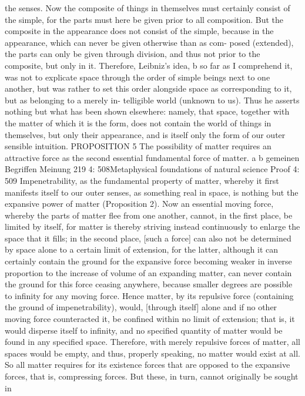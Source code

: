the senses. Now the composite of things in themselves must certainly consist
of the simple, for the parts must here be given prior to all composition.
But the composite in the appearance does not consist of the simple, because
in the appearance, which can never be given otherwise than as com-
posed (extended), the parts can only be given through division, and thus
not prior to the composite, but only in it. Therefore, Leibniz’s idea, b
so far as I comprehend it, was not to explicate space through the order
of simple beings next to one another, but was rather to set this order
alongside space as corresponding to it, but as belonging to a merely in-
telligible world (unknown to us). Thus he asserts nothing but what has
been shown elsewhere: namely, that space, together with the matter of
which it is the form, does not contain the world of things in themselves,
but only their appearance, and is itself only the form of our outer sensible
intuition.
PROPOSITION 5
The possibility of matter requires an attractive force as the second essential
fundamental force of matter.
a
b
gemeinen Begriffen
Meinung
219
4: 508Metaphysical foundations of natural science
Proof
4: 509
Impenetrability, as the fundamental property of matter, whereby it ﬁrst
manifests itself to our outer senses, as something real in space, is nothing
but the expansive power of matter (Proposition 2). Now an essential
moving force, whereby the parts of matter ﬂee from one another, cannot,
in the ﬁrst place, be limited by itself, for matter is thereby striving instead
continuously to enlarge the space that it ﬁlls; in the second place, [such a
force] can also not be determined by space alone to a certain limit of
extension, for the latter, although it can certainly contain the ground
for the expansive force becoming weaker in inverse proportion to the
increase of volume of an expanding matter, can never contain the ground
for this force ceasing anywhere, because smaller degrees are possible
to inﬁnity for any moving force. Hence matter, by its repulsive force
(containing the ground of impenetrability), would, [through itself] alone
and if no other moving force counteracted it, be conﬁned within no limit
of extension; that is, it would disperse itself to inﬁnity, and no speciﬁed
quantity of matter would be found in any speciﬁed space. Therefore, with
merely repulsive forces of matter, all spaces would be empty, and thus,
properly speaking, no matter would exist at all. So all matter requires
for its existence forces that are opposed to the expansive forces, that is,
compressing forces. But these, in turn, cannot originally be sought in
